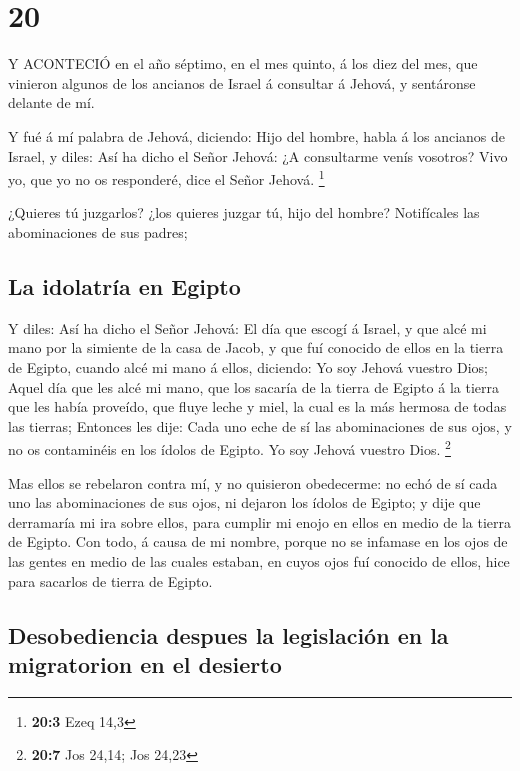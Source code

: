 \hypertarget{section-19}{%
\section{20}\label{section-19}}

 Y ACONTECIÓ en el año séptimo, en el mes quinto, á los diez
del mes, que vinieron algunos de los ancianos de Israel á consultar á
Jehová, y sentáronse delante de mí.

 Y fué á mí palabra de Jehová, diciendo:  Hijo
del hombre, habla á los ancianos de Israel, y diles: Así ha dicho el
Señor Jehová: ¿A consultarme venís vosotros? Vivo yo, que yo no os
responderé, dice el Señor Jehová. \footnote{\textbf{20:3} Ezeq 14,3}

 ¿Quieres tú juzgarlos? ¿los quieres juzgar tú, hijo del
hombre? Notifícales las abominaciones de sus padres;

\hypertarget{la-idolatruxeda-en-egipto}{%
\subsection{La idolatría en Egipto}\label{la-idolatruxeda-en-egipto}}

 Y diles: Así ha dicho el Señor Jehová: El día que escogí á
Israel, y que alcé mi mano por la simiente de la casa de Jacob, y que
fuí conocido de ellos en la tierra de Egipto, cuando alcé mi mano á
ellos, diciendo: Yo soy Jehová vuestro Dios;  Aquel día que
les alcé mi mano, que los sacaría de la tierra de Egipto á la tierra que
les había proveído, que fluye leche y miel, la cual es la más hermosa de
todas las tierras;  Entonces les dije: Cada uno eche de sí
las abominaciones de sus ojos, y no os contaminéis en los ídolos de
Egipto. Yo soy Jehová vuestro Dios. \footnote{\textbf{20:7} Jos 24,14;
  Jos 24,23}

 Mas ellos se rebelaron contra mí, y no quisieron
obedecerme: no echó de sí cada uno las abominaciones de sus ojos, ni
dejaron los ídolos de Egipto; y dije que derramaría mi ira sobre ellos,
para cumplir mi enojo en ellos en medio de la tierra de Egipto.
 Con todo, á causa de mi nombre, porque no se infamase en
los ojos de las gentes en medio de las cuales estaban, en cuyos ojos fuí
conocido de ellos, hice para sacarlos de tierra de Egipto.

\hypertarget{desobediencia-despues-la-legislaciuxf3n-en-la-migratorion-en-el-desierto}{%
\subsection{Desobediencia despues la legislación en la migratorion en el
desierto}\label{desobediencia-despues-la-legislaciuxf3n-en-la-migratorion-en-el-desierto}}

